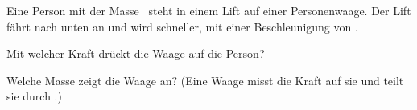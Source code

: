 Eine Person mit der Masse \mO\ steht in einem Lift auf einer Personenwaage. Der Lift fährt nach unten an und wird schneller, mit einer Beschleunigung von \aO.

\begin{abcliste}
\abc
Mit welcher Kraft drückt die Waage auf die Person?

\abc
Welche Masse zeigt die Waage an? (Eine Waage misst die Kraft auf sie und teilt sie durch \gO.)
\end{abcliste}

